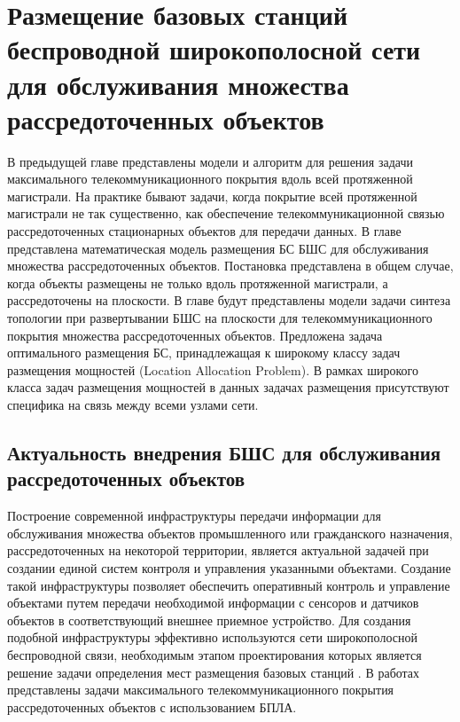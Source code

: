 \chapter{Размещение базовых станций беспроводной широкополосной сети для обслуживания множества рассредоточенных объектов}\label{ch:ch3}
 
В предыдущей главе представлены модели и алгоритм для решения задачи максимального телекоммуникационного покрытия вдоль всей протяженной магистрали. На практике бывают задачи, когда покрытие всей протяженной магистрали не так существенно, как обеспечение телекоммуникационной связью  рассредоточенных стационарных объектов для передачи данных. В главе представлена математическая модель размещения БС БШС для обслуживания множества рассредоточенных объектов. Постановка представлена в общем случае, когда объекты размещены не только вдоль протяженной магистрали, а рассредоточены на плоскости. В главе будут представлены модели задачи синтеза топологии при развертывании БШС на плоскости для телекоммуникационного покрытия множества рассредоточенных объектов. Предложена задача оптимального размещения БС, принадлежащая к широкому классу задач размещения мощностей (Location Allocation Problem). В рамках широкого класса задач размещения мощностей в данных задачах размещения присутствуют специфика на связь между всеми узлами сети.


\section{Актуальность внедрения БШС для обслуживания рассредоточенных объектов}

Построение современной инфраструктуры передачи информации для обслуживания множества объектов промышленного или гражданского назначения, рассредоточенных на некоторой территории, является актуальной задачей при создании единой систем контроля и управления указанными объектами.  Создание такой инфраструктуры позволяет обеспечить оперативный контроль и управление объектами путем передачи необходимой информации с сенсоров и датчиков объектов в соответствующий внешнее приемное устройство. Для создания подобной инфраструктуры эффективно используются сети широкополосной беспроводной связи, необходимым этапом проектирования которых является решение задачи определения мест размещения базовых станций \cite{VishnevskyBook}. В работах \cite{Cicek2019, Medvedeva2020, Khayrov2020} представлены задачи максимального телекоммуникационного покрытия рассредоточенных объектов с использованием БПЛА.

